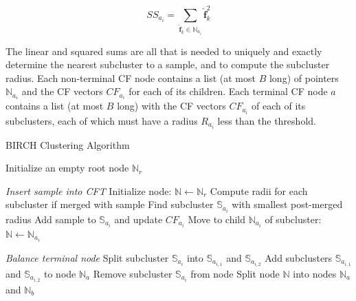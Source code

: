 \begin{equation}
\label{eqn:chap10-birch-square-sum}
SS_{a_{i}} = \displaystyle\sum\limits_{\boldsymbol{\hat{f}}_{k} \in \mathbb{N}_{a_{i}}} \boldsymbol{\hat{f}}_{k}^{2}
\end{equation}

\noindent The linear and squared sums are all that is needed to uniquely and exactly determine the nearest subcluster to a sample, and to compute the subcluster radius. Each non-terminal CF node contains a list (at most $B$ long) of pointers $\mathbb{N}_{a_{i}}$ and the CF vectors $CF_{a_{i}}$ for each of its children. Each terminal CF node $a$ contains a list (at most $B$ long) with the CF vectors $CF_{a_{i}}$ of each of its subclusters, each of which must have a radius $R_{a_{i}}$ less than the threshold.

\begin{algorithm}[h!]
\caption[BIRCH Clustering Algorithm]{BIRCH Clustering Algorithm}
\label{alg:chap10-birch}
\begin{algorithmic}[1]
  \State Initialize an empty root node $\mathbb{N}_{r}$
  
    \item[]
  
    \Statex \hspace{0.2in} \textit{Insert sample into CFT}
    \State Initialize  node: $\mathbb{N} \leftarrow \mathbb{N}_{r}$
      \State Compute radii for each subcluster if merged with sample 
      \State Find subcluster $\mathbb{S}_{a_{i}}$ with smallest post-merged radius
        \State Add sample to $\mathbb{S}_{a_{i}}$ and update $CF_{a_{i}}$ 
  	  \Else
  	    \State Move to child $\mathbb{N}_{a_{i}}$ of subcluster: $\mathbb{N} \leftarrow \mathbb{N}_{a_{i}}$
  	  \EndIf
    \EndFor

    \item[]

    \Statex \hspace{0.2in} \textit{Balance terminal node}
     
      \State Split subcluster $\mathbb{S}_{a_{i}}$ into $\mathbb{S}_{a_{i,1}}$ and $\mathbb{S}_{a_{i,2}}$
      \State Add subclusters $\mathbb{S}_{a_{i,1}}$ and $\mathbb{S}_{a_{i,2}}$ to node $\mathbb{N}_{a}$
      \State Remove subcluster $\mathbb{S}_{a_{i}}$ from node
        \State Split node $\mathbb{N}$ into nodes $\mathbb{N}_{a}$ and $\mathbb{N}_{b}$
      \EndIf
    \EndIf
    

\end{algorithmic}
\end{algorithm}
